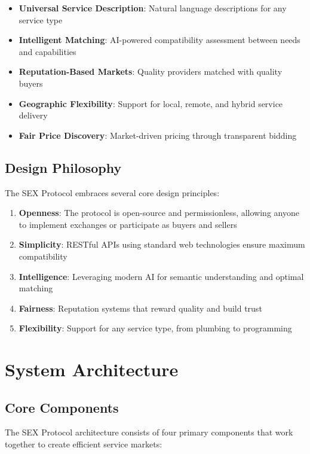 \documentclass[11pt,a4paper]{article}
\begin{document}
\begin{itemize}
    \item \textbf{Universal Service Description}: Natural language descriptions for any service type
    \item \textbf{Intelligent Matching}: AI-powered compatibility assessment between needs and capabilities
    \item \textbf{Reputation-Based Markets}: Quality providers matched with quality buyers
    \item \textbf{Geographic Flexibility}: Support for local, remote, and hybrid service delivery
    \item \textbf{Fair Price Discovery}: Market-driven pricing through transparent bidding
\end{itemize}

\subsection{Design Philosophy}

The SEX Protocol embraces several core design principles:

\begin{enumerate}
    \item \textbf{Openness}: The protocol is open-source and permissionless, allowing anyone to implement exchanges or participate as buyers and sellers
    \item \textbf{Simplicity}: RESTful APIs using standard web technologies ensure maximum compatibility
    \item \textbf{Intelligence}: Leveraging modern AI for semantic understanding and optimal matching
    \item \textbf{Fairness}: Reputation systems that reward quality and build trust
    \item \textbf{Flexibility}: Support for any service type, from plumbing to programming
\end{enumerate}

\section{System Architecture}

\subsection{Core Components}

The SEX Protocol architecture consists of four primary components that work together to create efficient service markets:
\end{document}
